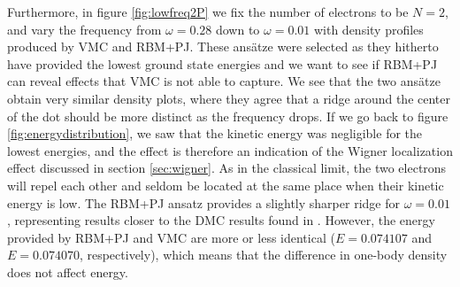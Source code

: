 Furthermore, in figure \eqref{fig:lowfreq2P} we fix the number of electrons to be $N=2$, and vary the frequency from $\omega=0.28$ down to $\omega=0.01$ with density profiles produced by VMC and RBM+PJ. These ansätze were selected as they hitherto have provided the lowest ground state energies and we want to see if RBM+PJ can reveal effects that VMC is not able to capture. We see that the two ansätze obtain very similar density plots, where they agree that a ridge around the center of the dot should be more distinct as the frequency drops. If we go back to figure \eqref{fig:energydistribution}, we saw that the kinetic energy was negligible for the lowest energies, and the effect is therefore an indication of the Wigner localization effect discussed in section \ref{sec:wigner}. As in the classical limit, the two electrons will repel each other and seldom be located at the same place when their kinetic energy is low. The RBM+PJ ansatz provides a slightly sharper ridge for $\omega=0.01$, representing results closer to the DMC results found in \citet{hogberget_quantum_2013}. However, the energy provided by RBM+PJ and VMC are more or less identical ($E=0.074107$ and $E=0.074070$, respectively), which means that the difference in one-body density does not affect energy.

